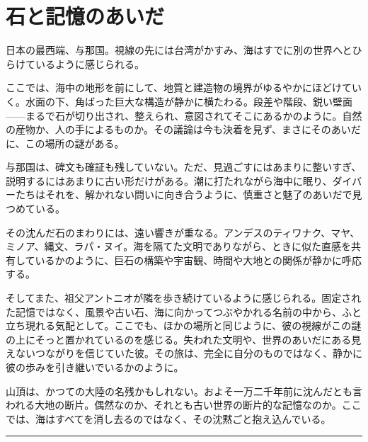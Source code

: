 \documentclass[
]{article}
\author{}
\date{}
\begin{document}
\section{石と記憶のあいだ}\label{ux77f3ux3068ux8a18ux61b6ux306eux3042ux3044ux3060}

日本の最西端、与那国。視線の先には台湾がかすみ、海はすでに別の世界へとひらけているように感じられる。

ここでは、海中の地形を前にして、地質と建造物の境界がゆるやかにほどけていく。水面の下、角ばった巨大な構造が静かに横たわる。段差や階段、鋭い壁面------まるで石が切り出され、整えられ、意図されてそこにあるかのように。自然の産物か、人の手によるものか。その議論は今も決着を見ず、まさにそのあいだに、この場所の謎がある。

与那国は、碑文も確証も残していない。ただ、見過ごすにはあまりに整いすぎ、説明するにはあまりに古い形だけがある。潮に打たれながら海中に眠り、ダイバーたちはそれを、解かれない問いに向き合うように、慎重さと魅了のあいだで見つめている。

その沈んだ石のまわりには、遠い響きが重なる。アンデスのティワナク、マヤ、ミノア、縄文、ラパ・ヌイ。海を隔てた文明でありながら、ときに似た直感を共有しているかのように、巨石の構築や宇宙観、時間や大地との関係が静かに呼応する。

そしてまた、祖父アントニオが隣を歩き続けているように感じられる。固定された記憶ではなく、風景や古い石、海に向かってつぶやかれる名前の中から、ふと立ち現れる気配として。ここでも、ほかの場所と同じように、彼の視線がこの謎の上にそっと置かれているのを感じる。失われた文明や、世界のあいだにある見えないつながりを信じていた彼。その旅は、完全に自分のものではなく、静かに彼の歩みを引き継いでいるかのように。

山頂は、かつての大陸の名残かもしれない。およそ一万二千年前に沈んだとも言われる大地の断片。偶然なのか、それとも古い世界の断片的な記憶なのか。ここでは、海はすべてを消し去るのではなく、その沈黙ごと抱え込んでいる。

\begin{center}\rule{0.5\linewidth}{0.5pt}\end{center}
\end{document}
